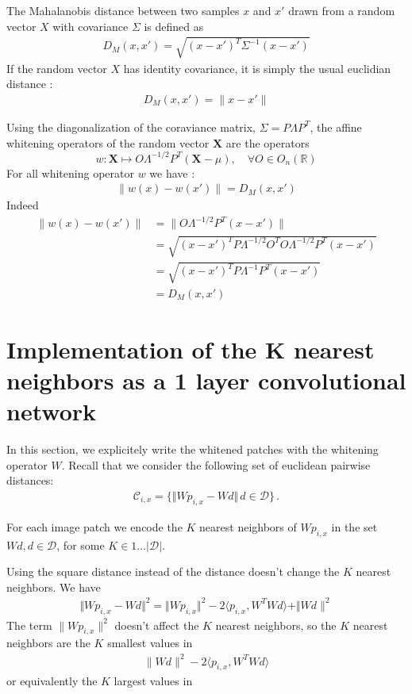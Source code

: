 \documentclass{article}
\begin{document}
{The Mahalanobis distance \citep{chandra1936generalised, mclachlan1999mahalanobis} between two samples $x$ and $x'$ drawn from a random vector $X$ with covariance $\Sigma$ is defined as  
\begin{align*} D_M (x, x' ) =  \sqrt{ (x - x')^T \Sigma^{-1} (x - x')} \end{align*}
If the random vector $X$ has identity covariance, it is simply the usual euclidian distance :
\begin{align*} D_M (x, x' ) =  \| x - x' \| \end{align*}

Using the diagonalization of the coraviance matrix,  $\Sigma = P\Lambda P^T$, the affine whitening operators of the random vector $\mathbf{X}$ are the operators 
\begin{equation}
\label{whitening}
     w : \mathbf{X} \mapsto O \Lambda^{-1/2} P^T (\mathbf{X} - \mu), \quad \forall O \in  O_n (\mathbb{R})
\end{equation}
For all whitening operator $w$ we have :
\begin{align*}
\|w(x) - w(x')\| = D_M(x, x')
\end{align*}
Indeed 
\begin{align*}
  \|w(x) - w(x')\|
    &= \| O \Lambda^{-1/2} P^T ( x - x') \|\\
    &= \sqrt{(x - x')^T P \Lambda^{-1/2} O^T O \Lambda^{-1/2} P^T (x - x') }\\
    &=  \sqrt{ (x - x')^T P \Lambda^{-1} P^T (x - x')} \\
    &= D_M(x, x') 
\end{align*}

\section{Implementation of the K nearest neighbors as a 1 layer convolutional network}

In this section, we explicitely write the whitened patches with the whitening operator $W$.
Recall that  we consider the following set of euclidean pairwise distances:
\begin{align*}\mathcal{C}_{i, x} =\{\Vert W p_{i, x} - W d \Vert\, d\in\mathcal{D} \}\,.\end{align*}

For each image patch we encode the $K$ nearest neighbors of $W p_{i,x}$ in the set $Wd, d \in \mathcal{D}$, for some $ K \in 1 \ldots|\mathcal{D}| $.

Using the square distance instead of the distance doesn't change the $K$ nearest neighbors.
We have 
\begin{align*} \Vert Wp_{i,x} - Wd \Vert^2 = \Vert Wp_{i,x} \Vert^2 - 2 \langle p_{i,x}, W^T W d \rangle + \Vert Wd\|^2 \end{align*}
The term $\|Wp_{i,x}\|^2$ doesn't affect the $K$ nearest neighbors, so the $K$ nearest neighbors are the $K$ smallest values in
\begin{align*}
        \|Wd \|^2 - 2\langle p_{i,x}, W^T W d \rangle
\end{align*}
or equivalently the  $K$ largest values in

}
\end{document}
